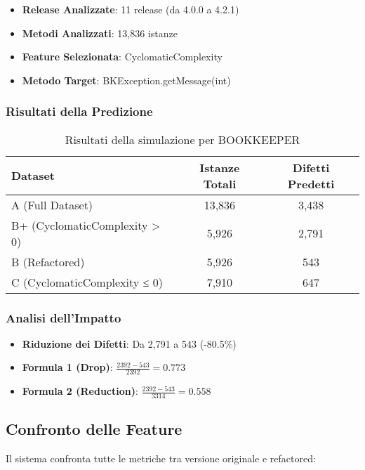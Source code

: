 \documentclass[12pt,a4paper]{article}
\begin{document}
\begin{itemize}
    \item \textbf{Release Analizzate}: 11 release (da 4.0.0 a 4.2.1)
    \item \textbf{Metodi Analizzati}: 13,836 istanze
    \item \textbf{Feature Selezionata}: CyclomaticComplexity
    \item \textbf{Metodo Target}: BKException.getMessage(int)
\end{itemize}

\subsubsection{Risultati della Predizione}

\begin{table}[H]
\centering
\begin{tabular}{@{}lcc@{}}
\toprule
\textbf{Dataset} & \textbf{Istanze Totali} & \textbf{Difetti Predetti} \\
\midrule
A (Full Dataset) & 13,836 & 3,438 \\
B+ (CyclomaticComplexity > 0) & 5,926 & 2,791 \\
B (Refactored) & 5,926 & 543 \\
C (CyclomaticComplexity ≤ 0) & 7,910 & 647 \\
\bottomrule
\end{tabular}
\caption{Risultati della simulazione per BOOKKEEPER}
\end{table}

\subsubsection{Analisi dell'Impatto}

\begin{itemize}
    \item \textbf{Riduzione dei Difetti}: Da 2,791 a 543 (-80.5\%)
    \item \textbf{Formula 1 (Drop)}: $\frac{2392 - 543}{2392} = 0.773$
    \item \textbf{Formula 2 (Reduction)}: $\frac{2392 - 543}{3314} = 0.558$
\end{itemize}

\subsection{Confronto delle Feature}

Il sistema confronta tutte le metriche tra versione originale e refactored:
\end{document}
